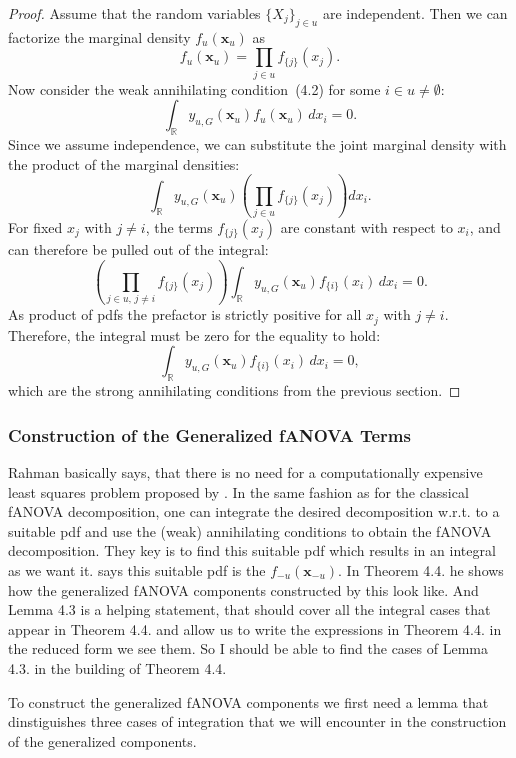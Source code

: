 \begin{proof}
Assume that the random variables $\{X_j\}_{j \in u}$ are independent. Then we can factorize the marginal density $f_u(\mathbf{x}_u)$ as
\[
f_u(\mathbf{x}_u) = \prod_{j \in u} f_{\{j\}}(x_j).
\]
Now consider the weak annihilating condition~(4.2) for some $i \in u \neq \emptyset$:
\[
\int_{\mathbb{R}} y_{u,G}(\mathbf{x}_u) f_u(\mathbf{x}_u) \, dx_i = 0.
\]
Since we assume independence, we can substitute the joint marginal density with the product of the marginal densities:
\[
\int_{\mathbb{R}} y_{u,G}(\mathbf{x}_u) \left( \prod_{j \in u} f_{\{j\}}(x_j) \right) dx_i.
\]
For fixed $x_j$ with $j \ne i$, the terms $f_{\{j\}}(x_j)$ are constant with respect to $x_i$, and can therefore be pulled out of the integral:
\[
\left( \prod_{j \in u,\, j \ne i} f_{\{j\}}(x_j) \right) \int_{\mathbb{R}} y_{u,G}(\mathbf{x}_u) f_{\{i\}}(x_i) \, dx_i = 0.
\]
As product of pdfs the prefactor is strictly positive for all $x_j$ with $j \ne i$. Therefore, the integral must be zero for the equality to hold:
\[
\int_{\mathbb{R}} y_{u,G}(\mathbf{x}_u) f_{\{i\}}(x_i) \, dx_i = 0,
\]
which are the strong annihilating conditions from the previous section.
\end{proof}


\subsubsection*{Construction of the Generalized fANOVA Terms}
Rahman basically says, that there is no need for a computationally expensive least squares problem proposed by \cite{hooker2007}. In the same fashion as for the classical fANOVA decomposition, one can integrate the desired decomposition w.r.t. to a suitable pdf and use the (weak) annihilating conditions to obtain the fANOVA decomposition. They key is to find this suitable pdf which results in an integral as we want it. \cite{rahman2014} says this suitable pdf is the $f_{-u}(\boldsymbol{x}_{-u})$. In Theorem 4.4. he shows how the generalized fANOVA components constructed by this look like. And Lemma 4.3 is a helping statement, that should cover all the integral cases that appear in Theorem 4.4. and allow us to write the expressions in Theorem 4.4. in the reduced form we see them. So I should be able to find the cases of Lemma 4.3. in the building of Theorem 4.4.

To construct the generalized fANOVA components we first need a lemma that dinstiguishes three cases of integration that we will encounter in the construction of the generalized components.


